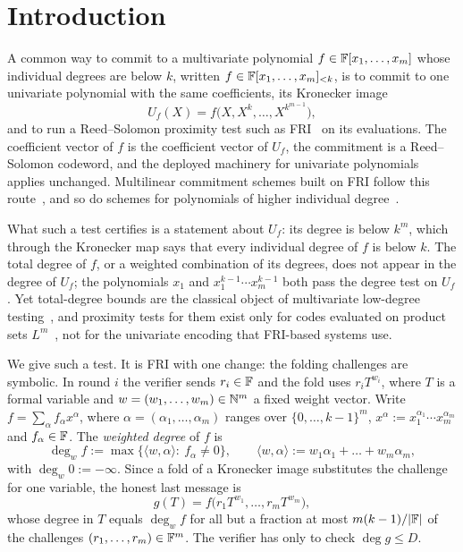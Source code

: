 \section{Introduction}\label{sec:intro}

A common way to commit to a multivariate polynomial
$f\in\mathbb{F}[x_1,\dots,x_m]$ whose individual degrees are below $k$, written
$f\in\mathbb{F}[x_1,\dots,x_m]_{<k}$, is to commit to one
univariate polynomial with the same coefficients, its Kronecker image
\[
U_f(X)=f\big(X,X^{k},\dots,X^{k^{m-1}}\big),
\]
and to run a Reed--Solomon proximity test such as FRI~\cite{BBHR18} on its evaluations. The
coefficient vector of $f$ is the coefficient vector of $U_f$, the commitment is a
Reed--Solomon codeword, and the deployed machinery for univariate polynomials applies
unchanged. Multilinear commitment schemes built on FRI follow this route~\cite{ZCF24}, and so
do schemes for polynomials of higher individual degree~\cite{PolyFRIM}.

What such a test certifies is a statement about $U_f$: its degree is below $k^m$, which
through the Kronecker map says that every individual degree of $f$ is below $k$. The total
degree of $f$, or a weighted combination of its degrees, does not appear in the degree of
$U_f$; the polynomials $x_1$ and $x_1^{k-1}\cdots x_m^{k-1}$ both pass the degree test on $U_f$. Yet
total-degree bounds are the classical object of multivariate low-degree
testing~\cite{RS96}, and proximity tests for them exist only for codes evaluated on product
sets $L^m$~\cite{ABN23,MZ25}, not for the univariate encoding that FRI-based systems use.

We give such a test. It is FRI with one change: the folding challenges are symbolic. In
round $i$ the verifier sends $r_i\in\mathbb{F}$ and the fold uses $r_iT^{w_i}$, where $T$ is a formal
variable and $w=(w_1,\dots,w_m)\in\mathbb{N}^m$ a fixed weight vector. Write
$f=\sum_{\alpha}f_\alpha x^\alpha$, where $\alpha=(\alpha_1,\dots,\alpha_m)$ ranges over
$\{0,\dots,k-1\}^m$, $x^\alpha:=x_1^{\alpha_1}\cdots x_m^{\alpha_m}$ and $f_\alpha\in\mathbb{F}$.
The \emph{weighted degree} of $f$ is
\[
\deg_wf:=\max\{\langle w,\alpha\rangle:\ f_\alpha\ne0\},\qquad
\langle w,\alpha\rangle:=w_1\alpha_1+\dots+w_m\alpha_m,
\]
with $\deg_w0:=-\infty$. Since a fold of a Kronecker image substitutes the
challenge for one variable, the honest last message is
\[
g(T)=f\big(r_1T^{w_1},\dots,r_mT^{w_m}\big),
\]
whose degree in $T$ equals $\deg_wf$ for all but a fraction at most $m(k-1)/|\mathbb{F}|$ of the
challenges $(r_1,\dots,r_m)\in\mathbb{F}^m$. The verifier has only to check $\deg g\le D$.

